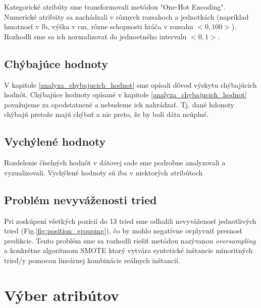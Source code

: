 \documentclass[runningheads]{llncs}
\begin{document}
Kategorické atribúty sme transformovali metódou "One-Hot Encoding". Numerické atribúty sa nachádzali v rôznych rozsahoch a jednotkách (napríklad hmotnosť v lb, výška v cm, rôzne schopnosti hráča v rozsahu $<0,100>$). Rozhodli sme sa ich normalizovať do jednoetného intervalu $<0,1>$.

\subsection{Chýbajúce hodnoty}

V kapitole \ref{analyza_chybajucich_hodnot} sme opísali dôvod výskytu chýbajúcich hodnôt. Chýbajúce hodnoty opísané v kapitole \ref{analyza_chybajucich_hodnot} považujeme za opodstatnené a nebudeme ich nahrádzať. Tj. dané hdonoty chýbajú pretože majú chýbať a nie preto, že by boli dáta neúplné.

\subsection{Vychýlené hodnoty}

Rozdelenie číselných hodnôt v dátovej sade sme podrobne analyzovali a vyzualizovali. Vychýlené hodnoty sú iba v niektorých atribútoch 

\subsection{Problém nevyváženosti tried}

Pri zoskúpení všetkých pozícií do 13 tried sme odhalili nevyváženosť jednotlivých tried (Fig.\ref{fig:position_grouping}), čo by mohlo negatívne ovplyvniť presnosť predikcie. Tento problém sme sa rozhodli riešiť metódou nazývanou \textit{oversampling} a konkrétne algoritmom SMOTE \cite{AlbertoFernandez2018} ktorý vytvára syntetické inštancie minoritných tried/y pomocou lineárnej kombinácie reálnych inštancií.

\section{Výber atribútov}
\end{document}
